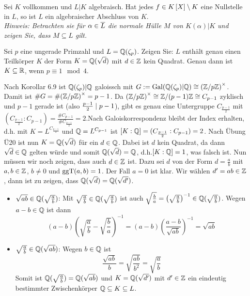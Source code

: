 \begin{exercisePage}
	\begin{exercise}
		Sei $K$ vollkommen und $L|K$ algebraisch. Hat jedes $f \in \polynom[K] \setminus K$ eine Nullstelle in $L$, so ist $L$ ein algebraischer Abschluss von $K$. \\
		\textit{Hinweis: Betrachten sie für $\alpha \in \overline{L}$ die normale Hülle $M$ von $K(\alpha)|K$ und zeigen Sie, dass $M \subseteq L$ gilt.}
	\end{exercise}

	\pagebreak

	\begin{exercise}
		Sei $p$ eine ungerade Primzahl und $L = \mathbb{Q}(\zeta_p)$. Zeigen Sie: $L$ enthält genau einen Teilkörper $K$ der Form $K = \mathbb{Q}(\sqrt{d})$ mit $d \in \mathbb{Z}$ kein Quadrat. Genau dann ist $K \subseteq \mathbb{R}$, wenn $p \equiv 1 \mod 4$. 
	\end{exercise}

	Nach Korollar 6.9 ist $\mathbb{Q}(\zeta_p) | \mathbb{Q}$ galoissch mit $G \mathrel{:=} \operatorname{Gal}(\mathbb{Q}(\zeta_p)|\mathbb{Q}) \mathrel{\cong} {(\mathbb{Z} / p \mathbb{Z})}^{\times}$. Damit ist $\# G = \# {(\mathbb{Z} / p \mathbb{Z})}^{\times} = p-1$. Da ${(\mathbb{Z} / p \mathbb{Z})}^{\times} \mathrel{\cong} \mathbb{Z} / (p-1) \mathbb{Z} \mathrel{\cong} C_{p-1}$ zyklisch und $p-1$ gerade ist (also $\frac{p-1}{2} \mathrel{\mid} p-1$), gibt es genau eine Untergruppe $C_{\frac{p-1}{2}}$ mit $(C_{\frac{p-1}{2}} : C_{p-1}) = \frac{\# C_{p-1}}{\# C_{\frac{p-1}{2}}} = 2$.Nach Galoiskorrespondenz bleibt der Index erhalten, d.h. mit $K = L^{C_{\frac{p-1}{2}}}$ und $\mathbb{Q} = L^{C_{p-1}}$ ist $[K : \mathbb{Q}] = (C_{\frac{p-1}{2}} : C_{p-1}) = 2$. Nach Übung Ü20 ist nun $K = \mathbb{Q}(\sqrt{d})$ für ein $d \in \mathbb{Q}$. Dabei ist $d$ kein Quadrat, da dann $\sqrt{d} \in \mathbb{Q}$ gelten würde und somit $\mathbb{Q}(\sqrt{d}) = \mathbb{Q}$, d.h.$[K : \mathbb{Q}] = 1$, was falsch ist. Nun müssen wir noch zeigen, dass auch $d \in \mathbb{Z}$ ist. Dazu sei $d$ von der Form $d = \frac{a}{b}$ mit $a,b \in \mathbb{Z}$, $b \neq 0$ und $\operatorname{ggT}(a,b) = 1$. Der Fall $a = 0$ ist klar. Wir wählen $d' = ab \in \mathbb{Z}$, dann ist zu zeigen, dass $\mathbb{Q}(\sqrt{d}) = \mathbb{Q}(\sqrt{d'})$. 
	\begin{itemize}[leftmargin=*]
		\item $\sqrt{ab} \in \mathbb{Q}(\sqrt{\frac{a}{b}})$: Mit $\sqrt{\frac{a}{b}} \in \mathbb{Q}(\sqrt{\frac{a}{b}})$ ist auch $\sqrt{\frac{b}{a}} = \left( \sqrt{\frac{a}{b}} \right)^{-1} \in \mathbb{Q}(\sqrt{\frac{a}{b}})$. Wegen $a - b \in \mathbb{Q}$ ist dann 
		\begin{equation*}
			(a-b) \left( \sqrt{\frac{a}{b}} - \sqrt{\frac{b}{a}} \right)^{-1} = (a-b) \left( \frac{a-b}{\sqrt{ab}} \right)^{-1} = \sqrt{ab}
		\end{equation*}
		\item $\sqrt{\frac{a}{b}} \in \mathbb{Q}(\sqrt{ab})$: Wegen $b \in \mathbb{Q}$ ist 
		\begin{equation*}
			\frac{\sqrt{ab}}{b} = \sqrt{\frac{ab}{b^2}} = \sqrt{\frac{a}{b}}
		\end{equation*}
		Somit ist $\mathbb{Q}(\sqrt{\frac{a}{b}}) = \mathbb{Q}(\sqrt{ab})$ und $K = \mathbb{Q}(\sqrt{d'})$ mit $d' \in \mathbb{Z}$ ein eindeutig bestimmter Zwischenkörper $\mathbb{Q} \subseteq K \subseteq L$.
	\end{itemize}


\end{exercisePage}
